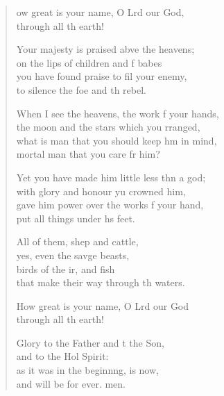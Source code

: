 \settowidth{\versewidth}{When I see the heavens, the work of your hands, *}
\begin{verse}%
  \begin{patverse}

ow great is your name, O Lrd our God,\Med\\
through all th earth!

Your majesty is praised abve the heavens;\Med\\
on the lips of children and f babes\\
you have found praise to fil your enemy,\Med\\
to silence the foe and th rebel.

When I see the heavens, the work f your hands,\Med\\
the moon and the stars which you rranged,\\
what is man that you should keep h\pointup{\i}m in mind,\Med\\
mortal man that you care fr him?

Yet you have made him little less thn a god;\Med\\
with glory and honour yu crowned him,\\
gave him power over the works f your hand,\Med\\
put all things under h\pointup{\i}s feet.

All of them, shep and cattle,\Med\\
yes, even the savge beasts,\\
birds of the ir, and fish\Med\\
that make their way through th waters.

How great is your name, O Lrd our God\\
through all th earth!

Glory to the Father and t the Son,\Med\\
and to the Hol Spirit:\\
as it was in the beginn\pointup{\i}ng, is now,\Med\\
and will be for ever. men.
  \end{patverse}
  \end{verse}
